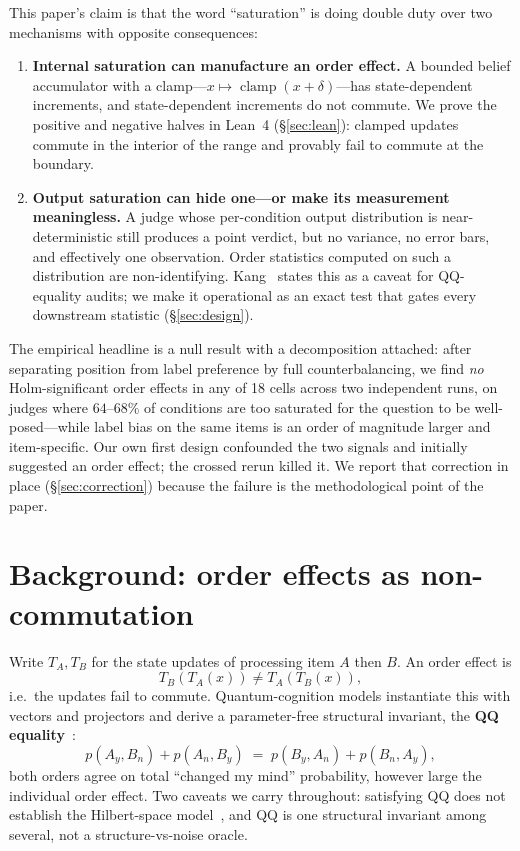 \documentclass[11pt]{article}
\begin{document}
This paper's claim is that the word ``saturation'' is doing double duty over
two mechanisms with opposite consequences:

\begin{enumerate}
\item \textbf{Internal saturation can manufacture an order effect.} A
bounded belief accumulator with a clamp---$x \mapsto \operatorname{clamp}(x
+ \delta)$---has state-dependent increments, and state-dependent increments
do not commute. We prove the positive and negative halves in Lean~4
(\S\ref{sec:lean}): clamped updates commute in the interior of the range and
provably fail to commute at the boundary.
\item \textbf{Output saturation can hide one---or make its measurement
meaningless.} A judge whose per-condition output distribution is
near-deterministic still produces a point verdict, but no variance, no error
bars, and effectively one observation. Order statistics computed on such a
distribution are non-identifying. Kang~\cite{kang2026} states this as a
caveat for QQ-equality audits; we make it operational as an exact test that
gates every downstream statistic (\S\ref{sec:design}).
\end{enumerate}

The empirical headline is a null result with a decomposition attached: after
separating position from label preference by full counterbalancing, we find
\emph{no} Holm-significant order effects in any of 18 cells across two
independent runs, on judges where $64$--$68\%$ of conditions are too
saturated for the question to be well-posed---while label bias on the same
items is an order of magnitude larger and item-specific. Our own first
design confounded the two signals and initially suggested an order effect;
the crossed rerun killed it. We report that correction in place
(\S\ref{sec:correction}) because the failure is the methodological point of
the paper.

\section{Background: order effects as non-commutation}

Write $T_A, T_B$ for the state updates of processing item $A$ then $B$. An
order effect is
\[
T_B(T_A(x)) \neq T_A(T_B(x)),
\]
i.e.\ the updates fail to commute. Quantum-cognition models instantiate this
with vectors and projectors and derive a parameter-free structural
invariant, the \textbf{QQ equality}~\cite{wang2013,wang2014}:
\[
p(A_y, B_n) + p(A_n, B_y) \;=\; p(B_y, A_n) + p(B_n, A_y),
\]
both orders agree on total ``changed my mind'' probability, however large
the individual order effect. Two caveats we carry throughout: satisfying QQ
does not establish the Hilbert-space model~\cite{boyerkassem2016}, and QQ is
one structural invariant among several, not a structure-vs-noise oracle.
\end{document}
